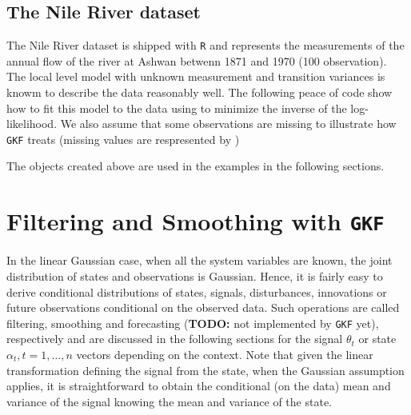 \documentclass{article}
\newcommand{\R}{\texttt{R}\xspace}
\newcommand{\GKF}{\texttt{GKF}\xspace}
\begin{document}
\subsection{The Nile River dataset}
The Nile River dataset is shipped with \R and represents the measurements of the annual flow
of the river at Ashwan betwenn 1871 and 1970 (100 observation). The local level model with
unknown measurement and transition variances is knowm to describe the data reasonably
well. The following peace of code show how to fit this model to the data using \verb@optim@
to minimize the inverse of the log-likelihood. We also assume that some observations are
missing to illustrate how \GKF treats \verb@NA@ (missing values are respresented by
\verb@NA@)
\begin{Schunk}
\end{Schunk}


The objects created above are used in the examples in the following sections.

\section{Filtering and Smoothing with \GKF}
\label{sec:FilterSmoothing}

In the linear Gaussian case, when all the system variables are known, the joint distribution
of states and observations is Gaussian. Hence, it is fairly easy to derive conditional
distributions of states, signals, disturbances, innovations or future observations
conditional on the observed data. Such operations are called filtering, smoothing and
forecasting (\textbf{TODO:} not implemented by \GKF yet), respectively and are discussed in
the following sections for the signal $\theta_t$ or state $\alpha_t,t=1,\dots,n$ vectors
depending on the context. Note that given the linear transformation defining the signal from
the state, when the Gaussian assumption applies, it is straightforward to obtain the
conditional (on the data) mean and variance of the signal knowing the mean and variance of
the state.
\end{document}
